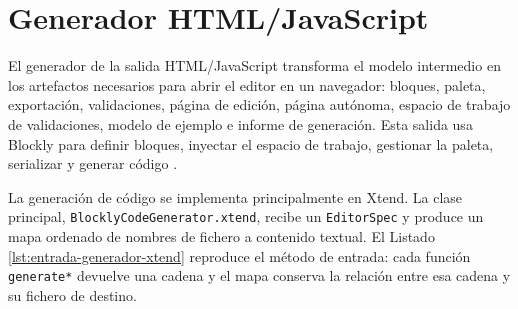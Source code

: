 \section{Generador HTML/JavaScript}
\label{sec:implementacion-generador-html}

El generador de la salida HTML/JavaScript transforma el modelo intermedio en los
artefactos necesarios para abrir el editor en un navegador: bloques, paleta,
exportación, validaciones, página de edición, página autónoma, espacio de trabajo de
validaciones, modelo de ejemplo e informe de generación. Esta salida usa Blockly
para definir bloques, inyectar el espacio de trabajo, gestionar la paleta, serializar y
generar código \cite{blocklyDocs}.

La generación de código se implementa principalmente en Xtend. La clase
principal, \texttt{Blockly\allowbreak{}Code\allowbreak{}Generator.xtend}, recibe
un \texttt{EditorSpec} y produce un mapa ordenado de nombres de fichero a
contenido textual. El Listado \ref{lst:entrada-generador-xtend} reproduce el
método de entrada: cada función \texttt{generate*} devuelve una cadena y el mapa
conserva la relación entre esa cadena y su fichero de destino.

